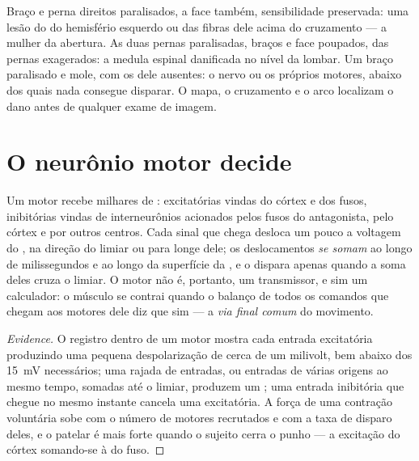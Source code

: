 \begin{example}\label{ex:g12:brain-and-movement:paralysis}
Braço e perna direitos paralisados, a face também, sensibilidade
preservada: uma lesão do  do hemisfério esquerdo ou das
fibras dele acima do cruzamento --- a mulher da abertura. As duas
pernas paralisadas, braços e face poupados,  das pernas
exagerados: a medula espinal danificada no nível da lombar. Um braço
paralisado e mole, com os  dele ausentes: o nervo ou os próprios
 motores, abaixo dos quais nada consegue disparar. O mapa, o
cruzamento e o arco localizam o dano antes de qualquer exame de imagem.
\end{example}

\section{O neurônio motor decide}

\begin{proposition}\label{prop:g12:brain-and-movement:integration}
Um  motor recebe milhares de : excitatórias vindas do
córtex e dos fusos, inibitórias vindas de interneurônios acionados
pelos fusos do antagonista, pelo córtex e por outros centros. Cada
sinal que chega desloca um pouco a voltagem do , na direção do
limiar ou para longe dele; os deslocamentos \emph{se somam} ao longo de
milissegundos e ao longo da superfície da , e o  dispara
apenas quando a soma deles cruza o limiar. O  motor não é,
portanto, um transmissor, e sim um calculador: o músculo se contrai
quando o balanço de todos os comandos que chegam aos  motores
dele diz que sim --- a \emph{via final comum} do
movimento.
\end{proposition}
\begin{proof}[Evidence]
O registro dentro de um  motor mostra cada entrada excitatória
produzindo uma pequena despolarização de cerca de um milivolt, bem
abaixo dos \qty{15}{mV} necessários; uma rajada de entradas, ou
entradas de várias origens ao mesmo tempo, somadas até o limiar,
produzem um ; uma entrada inibitória que chegue no
mesmo instante cancela uma excitatória. A força de uma contração
voluntária sobe com o número de  motores recrutados e com a
taxa de disparo deles, e o  patelar é mais forte quando o
sujeito cerra o punho --- a excitação do córtex somando-se à do fuso.
\end{proof}

